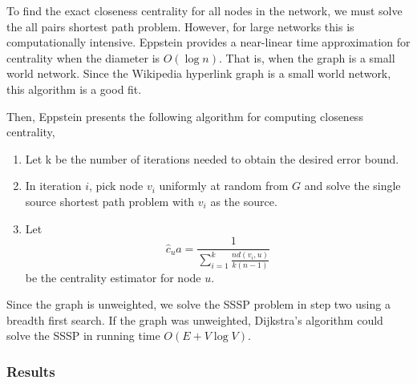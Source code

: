 \documentclass{article}
\begin{document}
To find the exact closeness centrality for all nodes in the network, we must solve the all pairs shortest path problem. However, for large networks this is computationally intensive. 
Eppstein provides a near-linear time approximation for centrality when the diameter is $O(\log n)$. That is, when the graph is a small world network. Since the Wikipedia hyperlink graph is a small world network, this algorithm is a good fit.

Then, Eppstein\autocite{eppstein} presents the following algorithm for computing closeness centrality,
\begin{enumerate}[1.]
    \item 
    Let k be the number of iterations needed to obtain the desired error bound.

    \item
    In iteration $i$, pick node $v_i$ uniformly at random from $G$ and solve the single source shortest path problem with $v_i$ as the source.

    \item 
    Let
    \begin{equation*}
        \hat{c}_ua = \frac{1}{\sum^k_{i=1} \frac{n d(v_i, u)}{k(n-1)}}
    \end{equation*}
    be the centrality estimator for node $u$.
\end{enumerate}

Since the graph is unweighted, we solve the SSSP problem in step two using a breadth first search. If the graph was unweighted, Dijkstra's algorithm could solve the SSSP in running time $O(E + V \log V)$.
\autocite{clrs} %

\subsubsection{Results}
\end{document}
